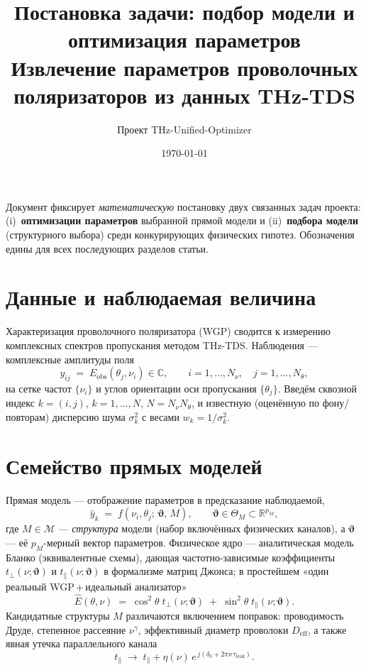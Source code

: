 \documentclass[11pt]{article}
\title{\vspace{-1.5em}Постановка задачи: подбор модели и оптимизация параметров\\
\large Извлечение параметров проволочных поляризаторов из данных THz-TDS}
\author{Проект THz-Unified-Optimizer}
\date{\today}
\newcommand{\vth}{\bm{\vartheta}}
\newcommand{\Deff}{D_{\mathrm{eff}}}
\begin{document}
\maketitle
\vspace{-1.5em}

\noindent
Документ фиксирует \emph{математическую} постановку двух связанных задач проекта:
(i)~\textbf{оптимизации параметров} выбранной прямой модели и (ii)~\textbf{подбора модели}
(структурного выбора) среди конкурирующих физических гипотез. Обозначения едины для всех
последующих разделов статьи.

\section{Данные и наблюдаемая величина}
Характеризация проволочного поляризатора (WGP) сводится к измерению комплексных спектров
пропускания методом THz-TDS. Наблюдения — комплексные амплитуды поля
\[
  y_{ij} \;=\; E_{\mathrm{obs}}(\theta_j,\nu_i)\in\mathbb{C},
  \qquad i=1,\dots,N_\nu,\quad j=1,\dots,N_\theta,
\]
на сетке частот $\{\nu_i\}$ и углов ориентации оси пропускания $\{\theta_j\}$. Введём сквозной
индекс $k=(i,j)$, $k=1,\dots,N$, $N=N_\nu N_\theta$, и известную (оценённую по фону/повторам)
дисперсию шума $\sigma_k^2$ с весами $w_k=1/\sigma_k^2$.

\section{Семейство прямых моделей}
Прямая модель — отображение параметров в предсказание наблюдаемой,
\[
  \hat y_k \;=\; f\!\left(\nu_i,\theta_j;\,\vth,\,M\right),
  \qquad \vth\in\Theta_M\subset\mathbb{R}^{p_M},
\]
где $M\in\mathcal{M}$ — \emph{структура} модели (набор включённых физических каналов), а
$\vth$ — её $p_M$-мерный вектор параметров. Физическое ядро — аналитическая модель Бланко
(эквивалентные схемы), дающая частотно-зависимые коэффициенты $t_\perp(\nu;\vth)$ и
$t_\parallel(\nu;\vth)$ в формализме матриц Джонса; в простейшем «один реальный WGP\,+\,идеальный
анализатор»
\[
  \hat E(\theta,\nu) \;=\; \cos^2\!\theta\;t_\perp(\nu;\vth)\;+\;\sin^2\!\theta\;t_\parallel(\nu;\vth).
\]
Кандидатные структуры $M$ различаются включением поправок: проводимость Друде, степенное
рассеяние $\nu^{\gamma}$, эффективный диаметр проволоки $\Deff$, а также явная утечка
параллельного канала
\[
  t_\parallel \;\to\; t_\parallel + \eta(\nu)\,e^{\,j(\delta_0+2\pi\nu\,\tau_{\mathrm{leak}})}.
\]
\end{document}
